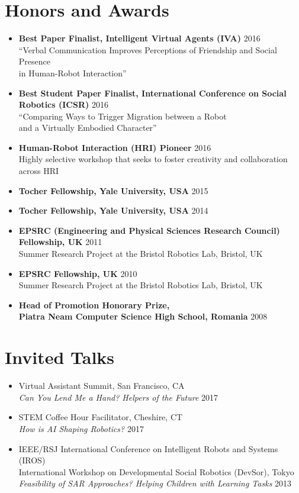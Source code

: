 \documentclass[10pt,letterpaper]{article}
\newcommand{\thing}[2]{{#1} \hfill {#2}}
\begin{document}
\section{Honors and Awards}
\begin{itemize}%
\item \thing{\bf Best Paper Finalist, Intelligent Virtual Agents (IVA)}{2016}\\
	``Verbal Communication Improves Perceptions of Friendship and Social Presence\\
	 in Human-Robot Interaction''
\item \thing{\bf Best Student Paper Finalist, International Conference on Social Robotics (ICSR)}{2016}\\
	``Comparing Ways to Trigger Migration between a Robot\\
	 and a Virtually Embodied Character''
\item \thing{\bf Human-Robot Interaction (HRI) Pioneer}{2016}\\
	 Highly selective workshop that seeks to foster creativity and collaboration across HRI
\item \thing{\bf Tocher Fellowship, Yale University, USA}{2015}
\item \thing{\bf Tocher Fellowship, Yale University, USA}{2014}
\item \thing{\bf EPSRC (Engineering and Physical Sciences Research Council) Fellowship, UK}{2011}\\
	Summer Research Project at the Bristol Robotics Lab, Bristol, UK
\item \thing{\bf EPSRC Fellowship, UK}{2010}\\
	Summer Research Project at the Bristol Robotics Lab, Bristol, UK
\item \thing{\bf Head of Promotion Honorary Prize,\\Piatra Neam Computer Science High School, Romania}{2008}
\end{itemize}

\section{Invited Talks}

\begin{itemize}%

\item \thing{Virtual Assistant Summit, San Francisco, CA \\ \it Can You Lend Me a Hand? Helpers of the Future}{2017}
\item \thing{STEM Coffee Hour Facilitator, Cheshire, CT \\ \it How is AI Shaping Robotics?}{2017}
\item \thing{IEEE/RSJ International Conference on Intelligent Robots and Systems (IROS) \\ International Workshop on Developmental Social Robotics (DevSor), Tokyo \\ \it Feasibility of SAR Approaches? Helping Children with Learning Tasks}{2013}

\end{itemize}
\end{document}

